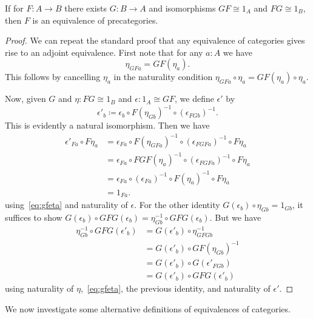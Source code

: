 \documentclass{mscs}
\newcommand{\defeq}{\coloneqq}  %
\numberwithin{equation}{section}
\begin{document}
\begin{lem}\label{ct:adjointification}
  If for $F:A\to B$ there exists $G:B\to A$ and isomorphisms $GF\cong 1_A$ and $FG\cong 1_B$, then $F$ is an equivalence of precategories.
\end{lem}
\begin{proof}
  We can repeat the standard proof that any equivalence of categories gives rise to an adjoint equivalence.
  First note that for any $a:A$ we have
  \begin{equation}
    \eta_{GFa} = GF(\eta_a).\label{eq:gfeta}
  \end{equation}
  This follows by cancelling $\eta_a$ in the naturality condition $\eta_{GFa} \circ \eta_a = GF(\eta_a) \circ \eta_a$.

  Now, given $G$ and $\eta:FG\cong 1_B$ and $\epsilon : 1_A \cong GF$, we define $\epsilon'$ by
  \[ \epsilon'_b \defeq
  \epsilon_b \circ
  F(\eta_{Gb})^{-1} \circ
  (\epsilon_{FGb})^{-1}.
  \]
  This is evidently a natural isomorphism.
  Then we have
  \begin{align*}
    \epsilon'_{Fa} \circ F\eta_{a}
    &= \epsilon_{Fa} \circ F(\eta_{GFa})^{-1} \circ (\epsilon_{FGFa})^{-1} \circ F\eta_a\\
    &= \epsilon_{Fa} \circ FGF(\eta_{a})^{-1} \circ (\epsilon_{FGFa})^{-1} \circ F\eta_a\\
    &= \epsilon_{Fa} \circ (\epsilon_{Fa})^{-1} \circ F(\eta_{a})^{-1} \circ F\eta_a\\
    &= 1_{Fa}.
  \end{align*}
  using~\eqref{eq:gfeta} and naturality of $\epsilon$.
  For the other identity $G(\epsilon_b) \circ \eta_{Gb} = 1_{Gb}$, it suffices to show $G(\epsilon_b) \circ GFG(\epsilon_b) = \eta_{Gb}^{-1} \circ GFG(\epsilon_b)$.
  But we have
  \begin{align*}
    \eta_{Gb}^{-1} \circ GFG(\epsilon'_b)
    &= G(\epsilon'_b) \circ \eta_{GFGb}^{-1}\\
    &= G(\epsilon'_b) \circ GF(\eta_{Gb})^{-1}\\
    &= G(\epsilon'_b) \circ G(\epsilon'_{FGb})\\
    &= G(\epsilon'_b) \circ GFG(\epsilon'_b)
  \end{align*}
  using naturality of $\eta$,~\eqref{eq:gfeta}, the previous identity, and naturality of $\epsilon'$.
\end{proof}

We now investigate some alternative definitions of equivalences of categories.
\end{document}
